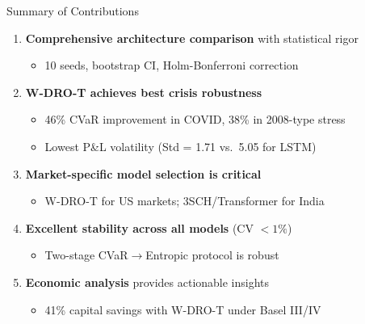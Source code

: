\documentclass[aspectratio=169,11pt]{beamer}
\begin{document}
\begin{frame}{Summary of Contributions}
\begin{enumerate}
    \item \textbf{Comprehensive architecture comparison} with statistical rigor
    \begin{itemize}
        \item 10 seeds, bootstrap CI, Holm-Bonferroni correction
    \end{itemize}
    
    \vspace{0.2cm}
    \item \textbf{W-DRO-T achieves best crisis robustness}
    \begin{itemize}
        \item 46\% CVaR improvement in COVID, 38\% in 2008-type stress
        \item Lowest P\&L volatility (Std = 1.71 vs.\ 5.05 for LSTM)
    \end{itemize}
    
    \vspace{0.2cm}
    \item \textbf{Market-specific model selection is critical}
    \begin{itemize}
        \item W-DRO-T for US markets; 3SCH/Transformer for India
    \end{itemize}
    
    \vspace{0.2cm}
    \item \textbf{Excellent stability across all models} (CV $< 1\%$)
    \begin{itemize}
        \item Two-stage CVaR$\rightarrow$Entropic protocol is robust
    \end{itemize}
    
    \vspace{0.2cm}
    \item \textbf{Economic analysis} provides actionable insights
    \begin{itemize}
        \item 41\% capital savings with W-DRO-T under Basel III/IV
    \end{itemize}
\end{enumerate}
\end{frame}
\end{document}
